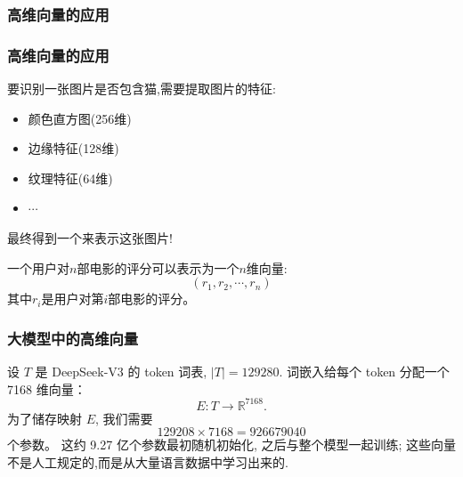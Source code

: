 \subsubsection{高维向量的应用}
\begin{frame}\frametitle{高维向量的应用}
\begin{example}[机器学习中的特征向量]
要识别一张图片是否包含猫,需要提取图片的特征:
\begin{itemize}
\item 颜色直方图(256维)
\item 边缘特征(128维)
\item 纹理特征(64维)
\item $\cdots$
\end{itemize}
\pp
最终得到一个来表示这张图片!
\end{example}
\pp

\begin{example}[推荐系统中的用户向量]
一个用户对$n$部电影的评分可以表示为一个$n$维向量:
\[(r_1,r_2,\cdots,r_n)\]
其中$r_i$是用户对第$i$部电影的评分。
\end{example}

\end{frame}

\begin{frame}\frametitle{大模型中的高维向量}

\begin{example}[DeepSeek-V3]
设 $T$ 是 DeepSeek-V3 的 token 词表,  $|T|=129280$. \pp 词嵌入给每个 token 分配一个 7168 维向量：
\[E \colon  T \longrightarrow \mathbb R^{7168}.\]
\pp
为了储存映射 $E$, 我们需要
\[129208 \times 7168 = 926679040\]
个参数。
\pp
这约 9.27 亿个参数最初随机初始化, 之后与整个模型一起训练; 这些向量不是人工规定的,而是从大量语言数据中学习出来的.
\end{example}



\end{frame}





